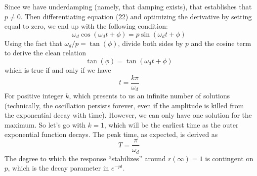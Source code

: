 \documentclass[a4paper]{article}
\begin{document}

Since we have underdamping (namely, that damping exists), that establishes that \( p \neq 0 \). Then differentiating equation (22) and optimizing the derivative by setting equal to zero, we end up with the following condition:
\[
	\omega_{d } \cos\!\left(\omega_{d } t + \phi \right) = p \sin\!\left(\omega_{d }t + \phi \right)  
\]
Using the fact that \( \omega_{d } / p = \tan\!\left(\phi \right)  \), divide both sides by \( p  \) and the cosine term to derive the clean relation
\[
	\tan\!\left( \phi \right) = \tan\!\left( \omega_{d }t + \phi \right) 
\]
which is true if and only if we have
\[ 
	t = \frac{k \pi }{\omega_{d }} 
\]
For positive integer \( k  \), which presents to us an infinite number of solutions (technically, the oscillation persists forever, even if the amplitude is killed from the exponential decay with time). However, we can only have one solution for the maximum. So let's go with \( k = 1 \), which will be the earliest time as the outer exponential function decays. The peak time, as expected, is derived as 
\[
	T = \frac{\pi }{\omega_{d}} 
\]
The degree to which the response ``stabilizes'' around \( r \!\left( \infty \right) = 1 \) is contingent on \( p  \), which is the decay parameter in \( e^{-pt } \).

\vspace{12pt}

\end{document}

